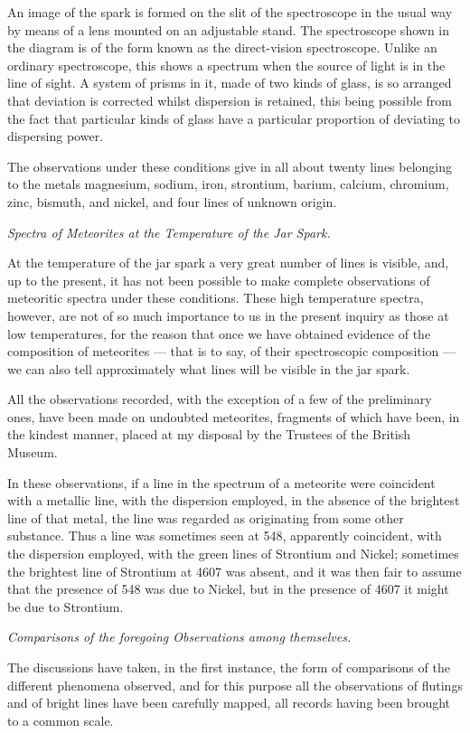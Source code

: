 \documentclass[a4paper, 12pt, oneside, polutonikogreek, english]{article}
\begin{document}
An image of the spark is formed on the slit of the spectroscope in the usual way by means of a lens mounted on an adjustable stand. The spectroscope shown in the diagram is of the form known as the direct-vision spectroscope. Unlike an ordinary spectroscope, this shows a spectrum when the source of light is in the line of sight. A system of prisms in it, made of two kinds of glass, is so arranged that deviation is corrected whilst dispersion is retained, this being possible from the fact that particular kinds of glass have a particular proportion of deviating to dispersing power.

The observations under these conditions give in all about twenty lines belonging to the metals magnesium, sodium, iron, strontium, barium, calcium, chromium, zinc, bismuth, and nickel, and four lines of unknown origin.

\emph{Spectra of Meteorites at the Temperature of the Jar Spark.}

At the temperature of the jar spark a very great number of lines is visible, and, up to the present, it has not been possible to make complete observations of meteoritic spectra under these conditions. These high temperature spectra, however, are not of so much importance to us in the present inquiry as those at low temperatures, for the reason that once we have obtained evidence of the composition of meteorites --- that is to say, of their spectroscopic composition --- we can also tell approximately what lines will be visible in the jar spark.

All the observations recorded, with the exception of a few of the preliminary ones, have been made on undoubted meteorites, fragments of which have been, in the kindest manner, placed at my disposal by the Trustees of the British Museum.

In these observations, if a line in the spectrum of a meteorite were coincident with a metallic line, with the dispersion employed, in the absence of the brightest line of that metal, the line was regarded as originating from some other substance. Thus a line was sometimes seen at 548, apparently coincident, with the dispersion employed, with the green lines of Strontium and Nickel; sometimes the brightest line of Strontium at 4607 was absent, and it was then fair to assume that the presence of 548 was due to Nickel, but in the presence of 4607 it might be due to Strontium.

\emph{Comparisons of the foregoing Observations among themselves.}

The discussions have taken, in the first instance, the form of comparisons of the different phenomena observed, and for this purpose all the observations of flutings and of bright lines have been carefully mapped, all records having been brought to a common scale.
\end{document}

